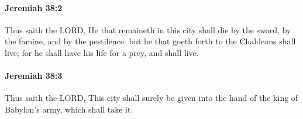 		\paragraph{Jeremiah 38:2} %
			\label{JEREMIAH-38-2}

			Thus saith the LORD, He that remaineth in this city shall die by the sword, by the famine, and by the pestilence: but he that goeth forth to the Chaldeans shall live; for he shall have his life for a prey, and shall live.


		\paragraph{Jeremiah 38:3} %
			\label{JEREMIAH-38-3}

			Thus saith the LORD, This city shall surely be given into the hand of the king of Babylon’s army, which shall take it.


